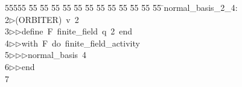 %
%
\begin{tabbing}
55555 \= 55 \= 55 \= 55 \= 55 \= 55 \= 55 \= 55 \= 55 \= 55 \= 55 \= 55 \= 55 \= \>normal\_basis\_2\_4:\\[0pt]
2\>$\triangleright$\>(ORBITER)\ v\ 2\ \\[0pt]
3\>$\triangleright$\>$\triangleright$\>define\ F\ finite\_field\ q\ 2\ end\ \\[0pt]
4\>$\triangleright$\>$\triangleright$\>with\ F\ do\ finite\_field\_activity\ \\[0pt]
5\>$\triangleright$\>$\triangleright$\>$\triangleright$\>normal\_basis\ 4\ \\[0pt]
6\>$\triangleright$\>$\triangleright$\>end\\[0pt]
7\>\end{tabbing}
